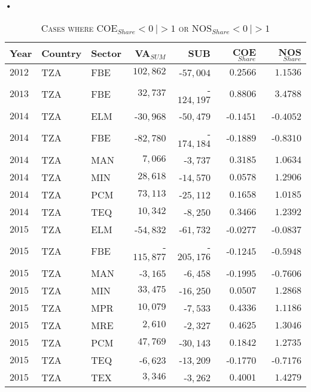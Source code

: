 \textbf{\textbf{•}}\documentclass[a4paper]{article}
\begin{document}
\begin{table}[h!] \centering 
  \caption{\textsc{Cases where COE$_{Share} < 0\ | > 1$ or NOS$_{Share} < 0\ | > 1$}} 
  \label{tab:VADEC_OUTL} 
    \vspace{2mm}
\begin{tabular}{lllrrrr} \toprule
Year & Country & Sector & VA$_{SUM}$ & SUB & COE$_{Share}$ & NOS$_{Share}$ \\ \midrule
$2012$ & TZA & FBE & $102,862$ & -$57,004$ & $0.2566$ & $1.1536$ \\ 
$2013$ & TZA & FBE & $32,737$ & -$124,197$ & $0.8806$ & $3.4788$ \\ 
$2014$ & TZA & ELM & -$30,968$ & -$50,479$ & -$0.1451$ & -$0.4052$ \\ 
$2014$ & TZA & FBE & -$82,780$ & -$174,184$ & -$0.1889$ & -$0.8310$ \\ 
$2014$ & TZA & MAN & $7,066$ & -$3,737$ & $0.3185$ & $1.0634$ \\ 
$2014$ & TZA & MIN & $28,618$ & -$14,570$ & $0.0578$ & $1.2906$ \\ 
$2014$ & TZA & PCM & $73,113$ & -$25,112$ & $0.1658$ & $1.0185$ \\ 
$2014$ & TZA & TEQ & $10,342$ & -$8,250$ & $0.3466$ & $1.2392$ \\ 
$2015$ & TZA & ELM & -$54,832$ & -$61,732$ & -$0.0277$ & -$0.0837$ \\ 
$2015$ & TZA & FBE & -$115,877$ & -$205,176$ & -$0.1245$ & -$0.5948$ \\ 
$2015$ & TZA & MAN & -$3,165$ & -$6,458$ & -$0.1995$ & -$0.7606$ \\ 
$2015$ & TZA & MIN & $33,475$ & -$16,250$ & $0.0507$ & $1.2868$ \\ 
$2015$ & TZA & MPR & $10,079$ & -$7,533$ & $0.4336$ & $1.1186$ \\ 
$2015$ & TZA & MRE & $2,610$ & -$2,327$ & $0.4625$ & $1.3046$ \\ 
$2015$ & TZA & PCM & $47,769$ & -$30,143$ & $0.1842$ & $1.2735$ \\ 
$2015$ & TZA & TEQ & -$6,623$ & -$13,209$ & -$0.1770$ & -$0.7176$ \\ 
$2015$ & TZA & TEX & $3,346$ & -$3,262$ & $0.4001$ & $1.4279$ \\ \bottomrule
\end{tabular} 
\end{table} 
\FloatBarrier
\end{document}
